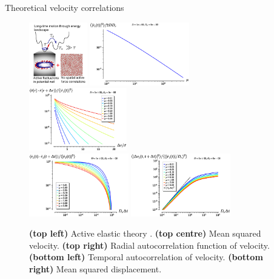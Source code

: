 \documentclass{beamer}
\begin{document}
{
\footerwithoutframenumber

\begin{frame}[noframenumbering]{Theoretical velocity correlations}

\begin{figure}
\centering
\includegraphics[height=2.75cm]{henkes2020_fig1a.png}
\includegraphics[height=2.75cm]{henkes_natcomm_2020_eq11.eps}
\includegraphics[height=2.75cm]{henkes_natcomm_2020_eq62.eps}\\
\includegraphics[height=2.75cm]{henkes_natcomm_2020_eq57.eps}
\includegraphics[height=2.75cm]{henkes_natcomm_2020_eq57_msd.eps}
\caption{{\bf (top left)} Active elastic theory . {\bf (top centre)} Mean squared velocity. {\bf (top right)} Radial autocorrelation function of velocity. {\bf (bottom left)} Temporal autocorrelation of velocity. {\bf (bottom right)} Mean squared displacement.}
\end{figure}

\vspace{-10pt}


\end{frame}}
\end{document}

